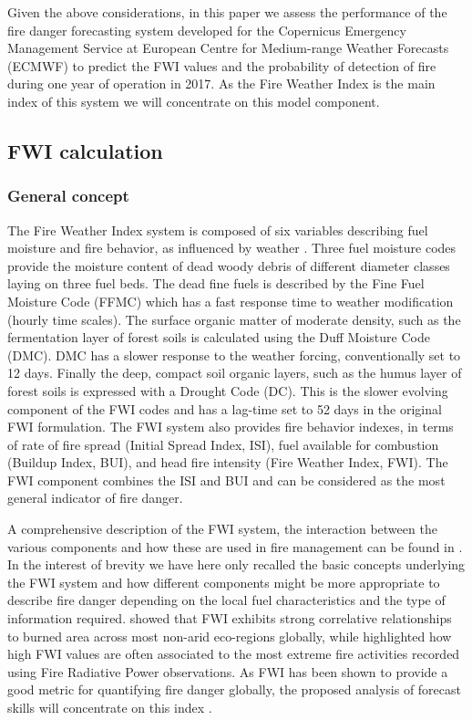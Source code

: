 \documentclass[, manuscript]{copernicus}
\begin{document}
Given the above considerations, in this paper we assess the performance
of the fire danger forecasting system developed for the Copernicus
Emergency Management Service at European Centre for Medium-range Weather
Forecasts (ECMWF) to predict the FWI values and the probability of
detection of fire during one year of operation in 2017. As the Fire
Weather Index is the main index of this system we will concentrate on
this model component.

\subsection{FWI calculation}\subsubsection{General concept}

The Fire Weather Index system is composed of six variables describing
fuel moisture and fire behavior, as influenced by weather
\citep{vanwagner:87}. Three fuel moisture codes provide the moisture
content of dead woody debris of different diameter classes laying on
three fuel beds. The dead fine fuels is described by the Fine Fuel
Moisture Code (FFMC) which has a fast response time to weather
modification (hourly time scales). The surface organic matter of
moderate density, such as the fermentation layer of forest soils
\citep{hood:10} is calculated using the Duff Moisture Code (DMC). DMC
has a slower response to the weather forcing, conventionally set to 12
days. Finally the deep, compact soil organic layers, such as the humus
layer of forest soils \citet{hood:10} is expressed with a Drought Code
(DC). This is the slower evolving component of the FWI codes and has a
lag-time set to 52 days in the original FWI formulation. The FWI system
also provides fire behavior indexes, in terms of rate of fire spread
(Initial Spread Index, ISI), fuel available for combustion (Buildup
Index, BUI), and head fire intensity (Fire Weather Index, FWI). The FWI
component combines the ISI and BUI and can be considered as the most
general indicator of fire danger.

A comprehensive description of the FWI system, the interaction between
the various components and how these are used in fire management can be
found in \citep{vanwagner:87,wotton:09}. In the interest of brevity we
have here only recalled the basic concepts underlying the FWI system and
how different components might be more appropriate to describe fire
danger depending on the local fuel characteristics and the type of
information required. \cite{abatzoglou:18} showed that FWI exhibits
strong correlative relationships to burned area across most non-arid
eco-regions globally, while \citet{bowman:17} highlighted how high FWI
values are often associated to the most extreme fire activities recorded
using Fire Radiative Power observations. As FWI has been shown to
provide a good metric for quantifying fire danger globally, the proposed
analysis of forecast skills will concentrate on this index
\citep{digiuseppe:16,degroot:07}.
\end{document}
